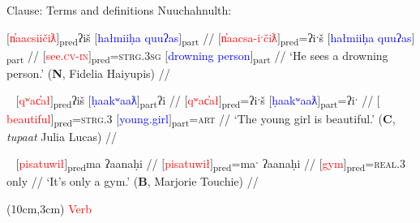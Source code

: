 \begin{frame}{Clause: Terms and definitions}
Nuuchahnulth:

\ex[exno=3] 
\begingl
\glpreamble $[$\textcolor{red}{n̓aacsiičiƛ}$]$\textsubscript{pred}ʔiš $[$\textcolor{blue}{hałmiiḥa quuʔas}$]$\textsubscript{part} //
\gla $[$\textcolor{red}{n̓aacsa-iˑčiƛ}$]$\textsubscript{pred}=ʔiˑš $[$\textcolor{blue}{hałmiiḥa quuʔas}$]$\textsubscript{part} //
\glb $[$\textcolor{red}{see.\textsc{cv}-\textsc{in}}$]$\textsubscript{pred}=\textsc{strg.3sg} $[$\textcolor{blue}{drowning person}$]$\textsubscript{part}	 //
\glft `He sees a drowning person.' (\textbf{N}, Fidelia Haiyupis) //
\endgl \label{ex:verbpred}
\xe

\pause

\ex[exno=4]~
\begingl
\glpreamble $[$\textcolor{red}{qʷac̓ał}$]$\textsubscript{pred}ʔiš $[$\textcolor{blue}{ḥaakʷaaƛ}$]$\textsubscript{part}ʔi //
\gla $[$\textcolor{red}{qʷac̓ał}$]$\textsubscript{pred}=ʔiˑš $[$\textcolor{blue}{ḥaakʷaaƛ}$]$\textsubscript{part}=ʔiˑ //
\glb $[$\textcolor{red}{beautiful}$]$\textsubscript{pred}=\textsc{strg.3} $[$\textcolor{blue}{young.girl}$]$\textsubscript{part}=\textsc{art} //
\glft `The young girl is beautiful.' (\textbf{C}, \textit{tupaat} Julia Lucas) //
\endgl \label{ex:adjpred}
\xe

\pause

\ex[exno=5]~
\begingl
\glpreamble $[$\textcolor{red}{pisatuwił}$]$\textsubscript{pred}ma ʔaanaḥi //
\gla $[$\textcolor{red}{pisatuwił}$]$\textsubscript{pred}=maˑ ʔaanaḥi //
\glb $[$\textcolor{red}{gym}$]$\textsubscript{pred}=\textsc{real.3} only //
\glft `It's only a gym.' (\textbf{B}, Marjorie Touchie) //
\endgl \label{ex:nounpred}
\xe

\begin{textblock*}{5cm}(10cm,3cm) %
   \textcolor{red}{Verb}
\end{textblock*}



\end{frame}

